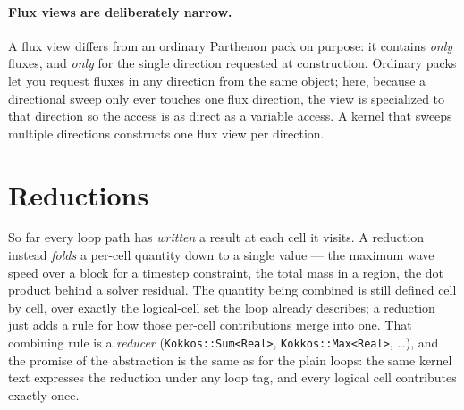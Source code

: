 \documentclass[11pt]{article}
\newcommand{\code}[1]{\lstinline[basicstyle=\ttfamily]|#1|}
\begin{document}
\paragraph{Flux views are deliberately narrow.} A flux view differs from an
ordinary Parthenon pack on purpose: it contains \emph{only} fluxes, and \emph{only}
for the single direction requested at construction. Ordinary packs let you request
fluxes in any direction from the same object; here, because a directional sweep
only ever touches one flux direction, the view is specialized to that direction so
the access is as direct as a variable access. A kernel that sweeps multiple
directions constructs one flux view per direction.

\section{Reductions}
\label{sec:reductions}

So far every loop path has \emph{written} a result at each cell it visits. A
reduction instead \emph{folds} a per-cell quantity down to a single value --- the
maximum wave speed over a block for a timestep constraint, the total mass in a
region, the dot product behind a solver residual. The quantity being combined is
still defined cell by cell, over exactly the logical-cell set the loop already
describes; a reduction just adds a rule for how those per-cell contributions merge
into one. That combining rule is a \emph{reducer} (\code{Kokkos::Sum<Real>},
\code{Kokkos::Max<Real>}, \dots), and the promise of the abstraction is the same as
for the plain loops: the same kernel text expresses the reduction under any loop
tag, and every logical cell contributes exactly once.
\end{document}
